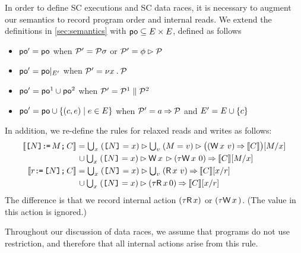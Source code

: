 In order to define SC executions and SC data races, it is necessary to
augment our semantics to record program order and internal reads.  We extend the definitions in
\textsection\ref{sec:semantics} with
${\mathrel{\mathsf{po}}}\subseteq{E}\times{E}$, defined as follows
\begin{itemize}
\item
  ${\mathrel{\mathsf{po}}'} = {\mathrel{\mathsf{po}}}$
  when $\mathcal{P}'=\mathcal{P}\sigma$
  or $\mathcal{P}'=\phi\mathbin\rhd\mathcal{P}$
\item
  ${\mathrel{\mathsf{po}}'} = {\mathrel{\mathsf{po}}}\mathbin{|}_{E'}$
  when $\mathcal{P}'=\nu x\mathbin.\mathcal{P}$
\item
  ${\mathrel{\mathsf{po}}'} = {\mathrel{\mathsf{po}}}^1\cup{\ensuremath{\mathrel{\mathsf{po}}}}^2$
  when $\mathcal{P}'=\mathcal{P}^1\parallel\mathcal{P}^2$
\item
  ${\mathrel{\mathsf{po}}'} = {\mathrel{\mathsf{po}}}\cup\{(c,e)\mid e\in E\}$
  when $\mathcal{P}'=a\mathbin\Rightarrow\mathcal{P}$ and $E' = E \cup \{c\}$
\end{itemize}
In addition, we re-define the rules for relaxed reads and writes as follows:
\begin{align*}
  \sem{\REF{\bExp}\GETS\aExp\SEMI \aCmd} & =
  \textstyle\bigcup_\aLoc\; (\REF{\bExp}=\aLoc) \guard \textstyle\bigcup_\aVal\;  (\aExp=\aVal) \guard\bigl((\DW\aLoc\aVal) \prefix \sem{\aCmd}\bigr)[\aExp/\aLoc]
  \\ & \mkern2mu\cup \textstyle\bigcup_\aLoc\; (\REF{\bExp}=\aLoc) \guard \DW{\aLoc}{} \guard (\iDW{\aLoc}{0}) \prefix \sem{\aCmd}[\aExp/\aLoc]
  \\
  \sem{\aReg\GETS\REF{\bExp}\SEMI \aCmd} & =
  \textstyle\bigcup_\aLoc\; (\REF{\bExp}=\aLoc) \guard \textstyle\bigcup_\aVal\; (\DR\aLoc\aVal) \prefix \sem{\aCmd}[\aLoc/\aReg] 
  \\ & \mkern2mu\cup \textstyle\bigcup_\aLoc\; (\REF{\bExp}=\aLoc) \guard (\iDR{\aLoc}{0}) \prefix \sem{\aCmd}[\aLoc/\aReg]
\end{align*}
The difference is that we record internal action
$(\iDR{\aLoc}{})$ or $(\iDW{\aLoc}{})$.  (The value in this action is ignored.)

Throughout our discussion of data races, we assume that programs do not use
restriction, and therefore that all internal actions arise from this rule.



